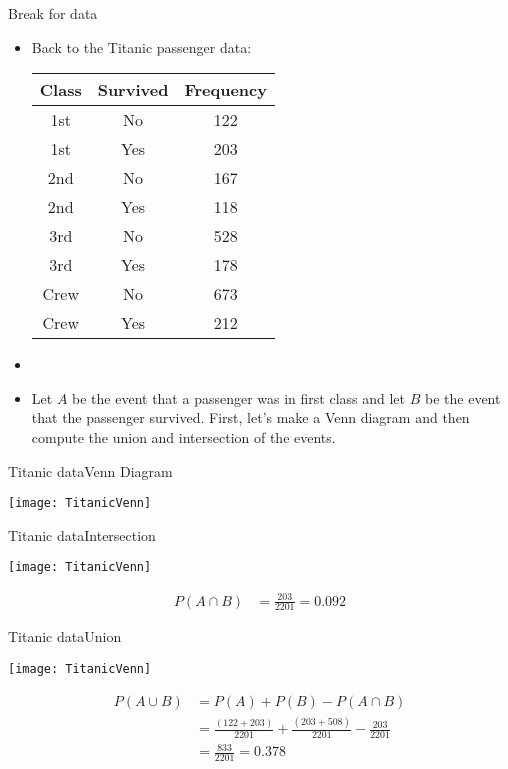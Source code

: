 \documentclass[xcolor=dvipsnames]{beamer}
\begin{document}
\begin{frame}{Break for data}
\begin{itemize}
	\item Back to the Titanic passenger data:
	\begin{center}
		\begin{tabular}{|c|c|c|} \hline
			\textbf{Class} & \textbf{Survived} & \textbf{Frequency} \\ \hline \hline
			1st  & No       &        122 \\ \hline 
			1st   &Yes       &       203\\ \hline 
			2nd   &No         &      167\\ \hline 
			2nd   &Yes         &     118\\ \hline 
			3rd   &No           &    528\\ \hline 
			3rd   &Yes           &   178\\ \hline 
			Crew  &No             &  673\\ \hline 
			Crew  &Yes             & 212\\ \hline 
		\end{tabular}
	\end{center}
	\item[]
	\item Let $A$ be the event that a passenger was in first class and let $B$ be the event that the passenger survived. First, let's make a Venn diagram and then compute the union and intersection of the events.
\end{itemize}
\end{frame}

\begin{frame}{Titanic data}{Venn Diagram}
	\begin{center}
		\texttt{[image: TitanicVenn]}
	\end{center}
\end{frame}

\begin{frame}{Titanic data}{Intersection}
\begin{center}
	\texttt{[image: TitanicVenn]}
\end{center}
\begin{align*}
P(A \cap B) &= \frac{203}{2201} = 0.092
\end{align*}
\end{frame}

\begin{frame}{Titanic data}{Union}
\begin{center}
	\texttt{[image: TitanicVenn]}
\end{center}
\begin{align*}
	P(A \cup B) &= P(A) + P(B) - P(A\cap B)\\
	&= \frac{(122 + 203)}{2201} + \frac{(203 + 508)}{2201} - \frac{203}{2201} \\
	&= \frac{833}{2201} = 0.378
\end{align*}
\end{frame}
\end{document}
